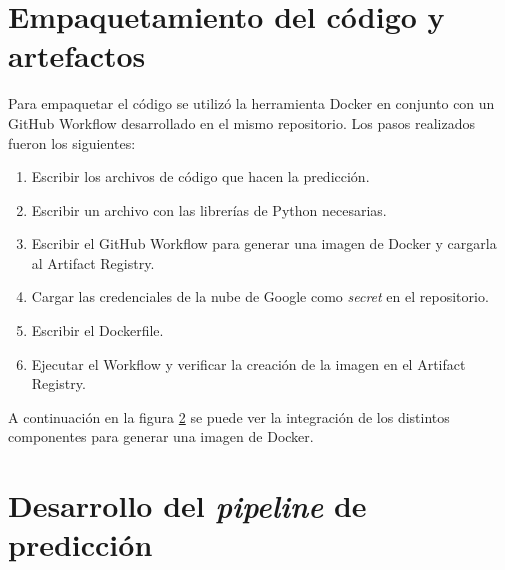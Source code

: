 
\section{Empaquetamiento del código y artefactos}

Para empaquetar el código se utilizó la herramienta Docker en conjunto con un GitHub Workflow desarrollado en el mismo repositorio. Los pasos realizados fueron los siguientes:
\begin{enumerate}
	\item Escribir los archivos de código que hacen la predicción.
	\item Escribir un archivo con las librerías de Python necesarias.
	\item Escribir el GitHub Workflow para generar una imagen de Docker y cargarla al Artifact Registry.
	\item Cargar las credenciales de la nube de Google como \textit{secret} en el repositorio.
	\item Escribir el Dockerfile.
	\item Ejecutar el Workflow y verificar la creación de la imagen en el Artifact Registry.
\end{enumerate}

A continuación en la figura \ref{} se puede ver la integración de los distintos componentes para generar una imagen de Docker.



\section{Desarrollo del \textit{pipeline} de predicción}


